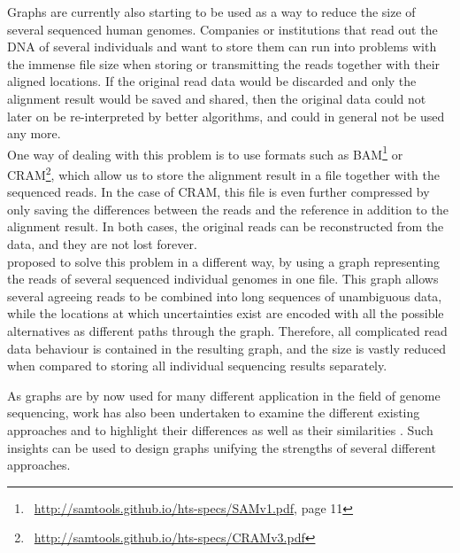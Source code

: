 \documentclass[a4paper,12pt,twoside,BCOR=10mm]{scrbook}
\begin{document}
Graphs are currently also starting to be used as a way to reduce the size of several sequenced human genomes.
Companies or institutions that read out the DNA of several individuals
and want to store them can run into problems with the immense file size when storing or transmitting the reads
together with their aligned locations.
If the original read data would be discarded and only the alignment result would be saved and shared,
then the original data could not later on be re-interpreted by better algorithms, and could in general
not be used any more. \\
One way of dealing with this problem is to use formats such as
BAM\footnote{\,\,\,\url{http://samtools.github.io/hts-specs/SAMv1.pdf}, page 11} or
CRAM\footnote{\,\,\,\url{http://samtools.github.io/hts-specs/CRAMv3.pdf}},
which allow us to store the alignment result in a file together with the sequenced reads.
In the case of CRAM, this file is even further compressed by only saving the differences
between the reads and the reference in addition to the alignment result.
In both cases, the original reads can be reconstructed from the data,
and they are not lost forever. \\
\citet{Li2014} proposed to solve this problem in a different way, by using a graph
representing the reads of several sequenced individual genomes in one file.
This graph allows several agreeing reads to be combined into long sequences of unambiguous data,
while the locations at which uncertainties exist are encoded with all the possible alternatives as
different paths through the graph. Therefore, all complicated read data behaviour is contained in the resulting
graph, and the size is vastly reduced when compared to storing all individual sequencing results separately.

As graphs are by now used for many different application in the field of genome sequencing,
work has also been undertaken to examine the different existing approaches and
to highlight their differences as well as their similarities \citep{Kehr2014}.
Such insights can be used to design graphs unifying the strengths of several different approaches.
\end{document}
